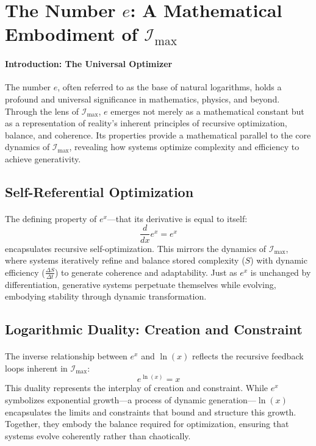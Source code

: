 \documentclass[12pt]{article}
\begin{document}
\section{The Number \(e\): A Mathematical Embodiment of \(\mathcal{I}_{\text{max}}\)}

\paragraph{Introduction: The Universal Optimizer}
The number \(e\), often referred to as the base of natural logarithms, holds a profound and universal significance in mathematics, physics, and beyond. Through the lens of \(\mathcal{I}_{\text{max}}\), \(e\) emerges not merely as a mathematical constant but as a representation of reality's inherent principles of recursive optimization, balance, and coherence. Its properties provide a mathematical parallel to the core dynamics of \(\mathcal{I}_{\text{max}}\), revealing how systems optimize complexity and efficiency to achieve generativity.

\subsection{Self-Referential Optimization}
\paragraph{}
The defining property of \(e^x\)—that its derivative is equal to itself:
\[
\frac{d}{dx} e^x = e^x
\]
encapsulates recursive self-optimization. This mirrors the dynamics of \(\mathcal{I}_{\text{max}}\), where systems iteratively refine and balance stored complexity (\(S\)) with dynamic efficiency (\(\frac{\Delta S}{\Delta t}\)) to generate coherence and adaptability. Just as \(e^x\) is unchanged by differentiation, generative systems perpetuate themselves while evolving, embodying stability through dynamic transformation.

\subsection{Logarithmic Duality: Creation and Constraint}
\paragraph{}
The inverse relationship between \(e^x\) and \(\ln(x)\) reflects the recursive feedback loops inherent in \(\mathcal{I}_{\text{max}}\):
\[
e^{\ln(x)} = x
\]
This duality represents the interplay of creation and constraint. While \(e^x\) symbolizes exponential growth—a process of dynamic generation—\(\ln(x)\) encapsulates the limits and constraints that bound and structure this growth. Together, they embody the balance required for optimization, ensuring that systems evolve coherently rather than chaotically.
\end{document}
